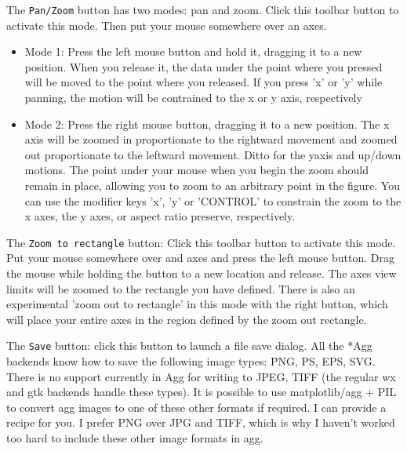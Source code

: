 \documentclass[twoside]{book}
\begin{document}
The \texttt{Pan/Zoom} button has two modes: pan and zoom.  Click this
toolbar button to activate this mode.  Then put your mouse somewhere
over an axes.

\begin{itemize}
\item Mode 1: Press the left mouse button and hold it, dragging it to
  a new position.  When you release it, the data under the point where
  you pressed will be moved to the point where you released.  If you
  press 'x' or 'y' while panning, the motion will be contrained to the
  x or y axis, respectively
  
\item Mode 2: Press the right mouse button, dragging it to a new
  position.  The x axis will be zoomed in proportionate to the
  rightward movement and zoomed out proportionate to the leftward
  movement.  Ditto for the yaxis and up/down motions.  The point under
  your mouse when you begin the zoom should remain in place, allowing
  you to zoom to an arbitrary point in the figure.  You can use the
  modifier keys 'x', 'y' or 'CONTROL' to constrain the zoom to the x
  axes, the y axes, or aspect ratio preserve, respectively.  

\end{itemize}


The \texttt{Zoom to rectangle} button: Click this toolbar button to
activate this mode.  Put your mouse somewhere over and axes and press
the left mouse button.  Drag the mouse while holding the button to a
new location and release.  The axes view limits will be zoomed to the
rectangle you have defined.  There is also an experimental 'zoom out
to rectangle' in this mode with the right button, which will place
your entire axes in the region defined by the zoom out rectangle.

The \texttt{Save} button: click this button to launch a file save
dialog.  All the *Agg backends know how to save the following image
types: PNG, PS, EPS, SVG.  There is no support currently in Agg for
writing to JPEG, TIFF (the regular wx and gtk backends handle these
types).  It is possible to use matplotlib/agg + PIL to convert agg
images to one of these other formats if required.  I can provide a
recipe for you.  I prefer PNG over JPG and TIFF, which is why I
haven't worked too hard to include these other image formats in agg.

\end{document}
